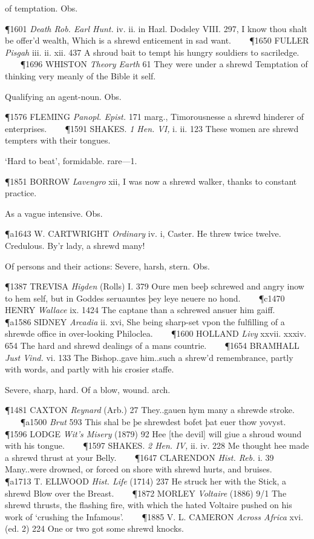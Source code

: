 \begin{description}[wide, labelwidth=!, labelindent=0pt]
\begin{myenumerate}
 of temptation. Obs.

\P 1601 \textit{Death  Rob. Earl Hunt.} iv. ii. in Hazl. Dodsley VIII. 297, I know thou shalt be offer'd wealth, Which is a shrewd enticement in sad want.    
\P 1650 FULLER  \textit{Pisgah} iii. ii. xii. 437 A shroud bait to tempt his hungry souldiers to sacriledge.    
\P 1696 WHISTON  \textit{Theory Earth} 61 They were under a shrewd Temptation of thinking very meanly of the Bible it self.

 Qualifying an agent-noun. Obs.

\P 1576 FLEMING  \textit{Panopl. Epist.} 171 marg., Timorousnesse a shrewd hinderer of enterprises.    
\P 1591 SHAKES.  \textit{1 Hen. VI,} i. ii. 123 These women are shrewd tempters with their tongues.

 ‘Hard to beat’, formidable. rare—1.

\P 1851 BORROW  \textit{Lavengro} xii, I was now a shrewd walker, thanks to constant practice.

 As a vague intensive. Obs.

\P a1643 W. CARTWRIGHT  \textit{Ordinary} iv. i, Caster. He threw twice twelve. Credulous. By'r lady, a shrewd many!

 Of persons and their actions: Severe, harsh, stern. Obs.

\P 1387 TREVISA  \textit{Higden} (Rolls) I. 379 Oure men beeþ schrewed and angry inow to hem self, but in Goddes seruauntes þey leye neuere no hond.    
\P c1470 HENRY  \textit{Wallace} ix. 1424 The  captane than a schrewed ansuer him gaiff.    
\P a1586 SIDNEY  \textit{Arcadia} ii. xvi, She being sharp-set vpon the fulfilling of a shrewde office in over-looking Philoclea.    
\P 1600 HOLLAND  \textit{Livy} xxvii. xxxiv. 654 The hard and shrewd dealings of a mans countrie.    
\P 1654 BRAMHALL  \textit{Just Vind.} vi. 133 The Bishop..gave him..such a shrew'd remembrance, partly with words, and partly with his crosier staffe.

 Severe, sharp, hard.  Of a blow, wound. arch.

\P 1481 CAXTON  \textit{Reynard} (Arb.) 27 They..gauen hym many a shrewde stroke.    
\P a1500  \textit{Brut} 593 This shal be þe shrewdest bofet þat euer thow yovyst.    
\P 1596 LODGE  \textit{Wit's Misery} (1879) 92 Hee [the devil] will giue a shroud wound with his tongue.    
\P 1597 SHAKES.  \textit{2 Hen. IV,} ii. iv. 228 Me thought hee made a shrewd thrust at your Belly.    
\P 1647 CLARENDON  \textit{Hist. Reb.} i. 39 Many..were drowned, or forced on shore with shrewd hurts, and bruises.    
\P a1713 T. ELLWOOD  \textit{Hist. Life} (1714) 237 He struck her with the Stick, a shrewd Blow over the Breast.    
\P 1872 MORLEY  \textit{Voltaire} (1886) 9/1 The shrewd thrusts, the flashing fire, with which the hated Voltaire pushed on his work of ‘crushing the Infamous’.    
\P 1885 V. L. CAMERON  \textit{Across Africa} xvi. (ed. 2) 224 One or two got some shrewd knocks.


\end{myenumerate}
\end{description}
